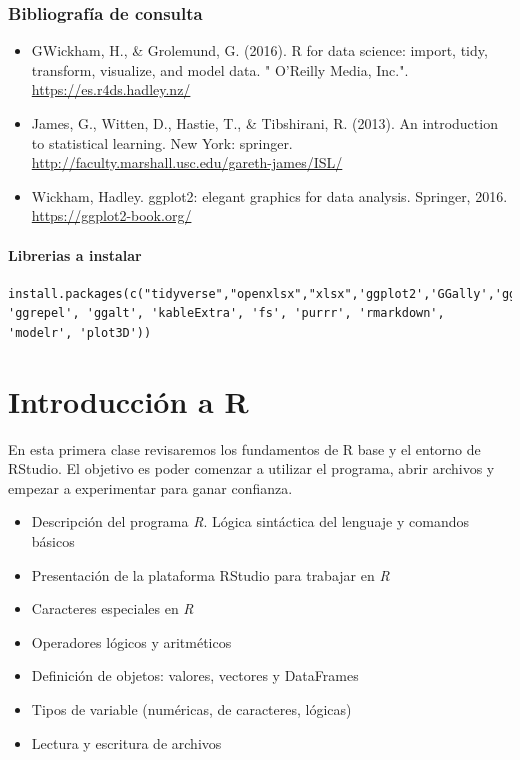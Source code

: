 \documentclass[]{book}
\providecommand{\tightlist}{%
  \setlength{\itemsep}{0pt}\setlength{\parskip}{0pt}}
\begin{document}
\hypertarget{bibliografia-de-consulta}{%
\subsection*{Bibliografía de consulta}\label{bibliografia-de-consulta}}

\begin{itemize}
\tightlist
\item
  GWickham, H., \& Grolemund, G. (2016). R for data science: import, tidy, transform, visualize, and model data. " O'Reilly Media, Inc.". \url{https://es.r4ds.hadley.nz/}
\item
  James, G., Witten, D., Hastie, T., \& Tibshirani, R. (2013). An introduction to statistical learning. New York: springer. \url{http://faculty.marshall.usc.edu/gareth-james/ISL/}
\item
  Wickham, Hadley. ggplot2: elegant graphics for data analysis. Springer, 2016. \url{https://ggplot2-book.org/}
\end{itemize}

\hypertarget{librerias-a-instalar}{%
\subsubsection*{Librerias a instalar}\label{librerias-a-instalar}}

\begin{verbatim}
install.packages(c("tidyverse","openxlsx","xlsx",'ggplot2','GGally','ggridges','treemapify','esquisse','cowplot','ggthemes', 'ggrepel', 'ggalt', 'kableExtra', 'fs', 'purrr', 'rmarkdown', 'modelr', 'plot3D'))
\end{verbatim}

\hypertarget{introduccion-a-r}{%
\chapter{Introducción a R}\label{introduccion-a-r}}

En esta primera clase revisaremos los fundamentos de R base y el entorno de RStudio. El objetivo es poder comenzar a utilizar el programa, abrir archivos y empezar a experimentar para ganar confianza.

\begin{itemize}
\tightlist
\item
  Descripción del programa \emph{R}. Lógica sintáctica del lenguaje y comandos básicos
\item
  Presentación de la plataforma RStudio para trabajar en \emph{R}
\item
  Caracteres especiales en \emph{R}
\item
  Operadores lógicos y aritméticos
\item
  Definición de objetos: valores, vectores y DataFrames
\item
  Tipos de variable (numéricas, de caracteres, lógicas)
\item
  Lectura y escritura de archivos
\end{itemize}
\end{document}
